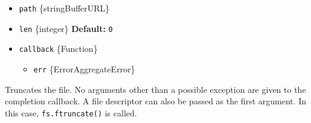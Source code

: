 \begin{itemize}
\tightlist
\item
  \texttt{path} \{string\textbar Buffer\textbar URL\}
\item
  \texttt{len} \{integer\} \textbf{Default:} \texttt{0}
\item
  \texttt{callback} \{Function\}

  \begin{itemize}
  \tightlist
  \item
    \texttt{err} \{Error\textbar AggregateError\}
  \end{itemize}
\end{itemize}

Truncates the file. No arguments other than a possible exception are
given to the completion callback. A file descriptor can also be passed
as the first argument. In this case, \texttt{fs.ftruncate()} is called.

\begin{Shaded}
\begin{Highlighting}[]
 \OperatorTok{;}
\NormalTok{(}\OperatorTok{,}\KeywordTok{=\textgreater{}}\NormalTok{ \{}
  \OperatorTok{;}
  \NormalTok{(}\NormalTok{)}\OperatorTok{;}
\NormalTok{\})}\OperatorTok{;}
\end{Highlighting}
\end{Shaded}

\begin{Shaded}
\begin{Highlighting}[]
\OperatorTok{=} \NormalTok{(}\NormalTok{)}\OperatorTok{;}
\NormalTok{(}\OperatorTok{,}\KeywordTok{=\textgreater{}}\NormalTok{ \{}
  \OperatorTok{;}
  \NormalTok{(}\NormalTok{)}\OperatorTok{;}
\NormalTok{\})}\OperatorTok{;}
\end{Highlighting}
\end{Shaded}


